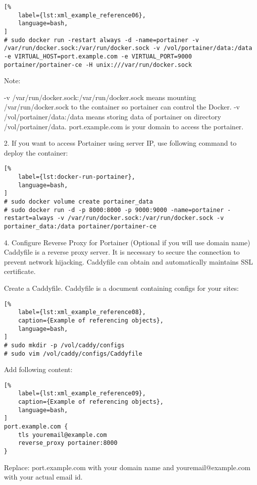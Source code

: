 \documentclass[%
	a4paper,
	oneside,
	listof=numbered,
	parskip=half,
	headsepline=true,
	footsepline=false,
	0.7headlines,
	]{scrbook}
\begin{document}
\begin{lstlisting}[%
	label={lst:xml_example_reference06},
	language=bash,
]
# sudo docker run -restart always -d -name=portainer -v /var/run/docker.sock:/var/run/docker.sock -v /vol/portainer/data:/data -e VIRTUAL_HOST=port.example.com -e VIRTUAL_PORT=9000 portainer/portainer-ce -H unix:///var/run/docker.sock
\end{lstlisting}


Note:

-v /var/run/docker.sock:/var/run/docker.sock means mounting /var/run/docker.sock to the container so portainer can control the Docker.
-v /vol/portainer/data:/data means storing data of portainer on directory /vol/portainer/data.
port.example.com is your domain to access the portainer.

2.
If you want to access Portainer using server IP, use following command to deploy the container:

\begin{lstlisting}[%
	label={lst:docker-run-portainer},
	language=bash,
]
# sudo docker volume create portainer_data
# sudo docker run -d -p 8000:8000 -p 9000:9000 -name=portainer -restart=always -v /var/run/docker.sock:/var/run/docker.sock -v portainer_data:/data portainer/portainer-ce
\end{lstlisting}


4. Configure Reverse Proxy for Portainer (Optional if you will use domain name)
Caddyfile is a reverse proxy server.
It is necessary to secure the connection to prevent network hijacking.
Caddyfile can obtain and automatically maintains SSL certificate.

Create a Caddyfile.
Caddyfile is a document containing configs for your sites:

\begin{lstlisting}[%
	label={lst:xml_example_reference08},
	caption={Example of referencing objects},
	language=bash,
]
# sudo mkdir -p /vol/caddy/configs
# sudo vim /vol/caddy/configs/Caddyfile
\end{lstlisting}


Add following content:

\begin{lstlisting}[%
	label={lst:xml_example_reference09},
	caption={Example of referencing objects},
	language=bash,
]
port.example.com {
	tls youremail@example.com
	reverse_proxy portainer:8000
}
\end{lstlisting}


Replace: port.example.com with your domain name and youremail@example.com with your actual email id.
\end{document}
